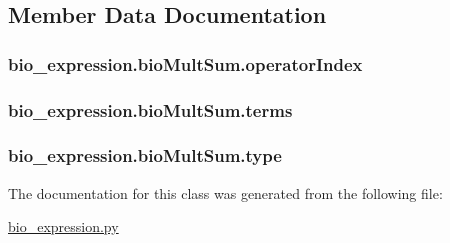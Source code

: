 \subsection{Member Data Documentation}
\hypertarget{classbio__expression_1_1bio_mult_sum_a0647bf214960ea95a89b9e2676362e77}{
\subsubsection[{operator\+Index}]{\setlength{\rightskip}{0pt plus 5cm}bio\+\_\+expression.\+bio\+Mult\+Sum.\+operator\+Index}}\label{classbio__expression_1_1bio_mult_sum_a0647bf214960ea95a89b9e2676362e77}
\hypertarget{classbio__expression_1_1bio_mult_sum_ac2578c75d1fe522acb4fcf63e7be9161}{
\subsubsection[{terms}]{\setlength{\rightskip}{0pt plus 5cm}bio\+\_\+expression.\+bio\+Mult\+Sum.\+terms}}\label{classbio__expression_1_1bio_mult_sum_ac2578c75d1fe522acb4fcf63e7be9161}
\hypertarget{classbio__expression_1_1bio_mult_sum_a725774ff889a9b510ae8710ae1931461}{
\subsubsection[{type}]{\setlength{\rightskip}{0pt plus 5cm}bio\+\_\+expression.\+bio\+Mult\+Sum.\+type}}\label{classbio__expression_1_1bio_mult_sum_a725774ff889a9b510ae8710ae1931461}


The documentation for this class was generated from the following file\+:\begin{DoxyCompactItemize}
\item 
\hyperlink{bio__expression_8py}{bio\+\_\+expression.\+py}\end{DoxyCompactItemize}
